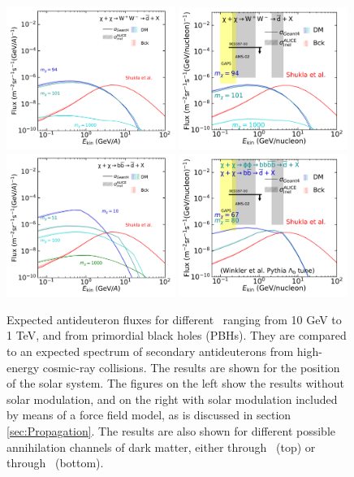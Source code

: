 \begin{figure}[hbtp]
    \centering
    \includegraphics[width=0.49\textwidth]{figures/antideuteron_LIS_WW.pdf}
    \includegraphics[width=0.49\textwidth]{figures/antideuteron_TOA_WW.pdf}
    \includegraphics[width=0.49\textwidth]{figures/antideuteron_LIS_bb.pdf}
    \includegraphics[width=0.49\textwidth]{figures/antideuteron_lambdaB_TOA.pdf}
    \caption{Expected antideuteron fluxes for different \dmm\ ranging from 10 GeV to 1 TeV, and from primordial black holes (PBHs). They are compared to an expected spectrum of secondary antideuterons from high-energy cosmic-ray collisions. The results are shown for the position of the solar system. The figures on the left show the results without solar modulation, and on the right with solar modulation included by means of a force field model, as is discussed in section \ref{sec:Propagation}. The results are also shown for different possible annihilation channels of dark matter, either through \WW\ (top) or through \bb\ (bottom).}
    \label{fig:Results_dbar_fluxes_diff_DM_masses}
\end{figure}

